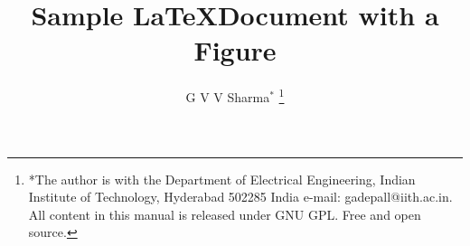 \documentclass[journal,12pt,onecolumn]{IEEEtran}
\begin{document}
\title{
Sample \LaTeX Document with a Figure
}
\author{ G V V Sharma$^{*}$%
	\thanks{*The author is with the Department
		of Electrical Engineering, Indian Institute of Technology, Hyderabad
		502285 India e-mail:  gadepall@iith.ac.in. All content in this manual is released under GNU GPL.  Free and open source.}
	
}	


%
%
%

% 
%



% 
\end{document}
